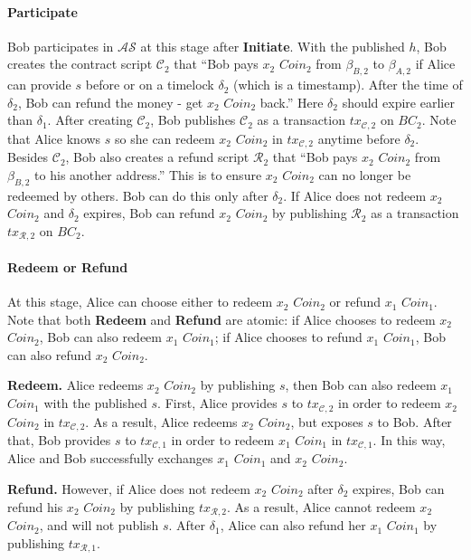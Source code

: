 \paragraph{\textbf{Participate}}
Bob participates in $\mathcal{AS}$ at this stage after \textbf{Initiate}.
With the published $h$, Bob creates the contract script $\mathcal{C}_2$ that ``Bob pays $x_2$ $Coin_2$ from $\beta_{B, 2}$ to $\beta_{A, 2}$ if Alice can provide $s$ before or on a timelock $\delta_2$ (which is a timestamp). After the time of $\delta_2$, Bob can refund the money - get $x_2$ $Coin_2$ back.''
Here $\delta_2$ should expire earlier than $\delta_1$.
After creating $\mathcal{C}_2$, Bob publishes $\mathcal{C}_2$ as a transaction $tx_{\mathcal{C}, 2}$ on $BC_2$.
Note that Alice knows $s$ so she can redeem $x_2$ $Coin_2$ in $tx_{\mathcal{C}, 2}$ anytime before $\delta_2$.
Besides $\mathcal{C}_2$, Bob also creates a refund script $\mathcal{R}_2$ that ``Bob pays $x_2$ $Coin_2$ from $\beta_{B, 2}$ to his another address.''
This is to ensure $x_2$ $Coin_2$ can no longer be redeemed by others. Bob can do this only after $\delta_2$.
If Alice does not redeem $x_2$ $Coin_2$ and $\delta_2$ expires, Bob can refund $x_2$ $Coin_2$ by publishing $\mathcal{R}_2$ as a transaction $tx_{\mathcal{R}, 2}$ on $BC_2$.

\paragraph{\textbf{Redeem} or \textbf{Refund}}
At this stage, Alice can choose either to redeem $x_2$ $Coin_2$ or refund $x_1$ $Coin_1$.
Note that both \textbf{Redeem} and \textbf{Refund} are atomic:
if Alice chooses to redeem $x_2$ $Coin_2$, Bob can also redeem $x_1$ $Coin_1$;
if Alice chooses to refund $x_1$ $Coin_1$, Bob can also refund $x_2$ $Coin_2$.

\textbf{Redeem.}
Alice redeems $x_2$ $Coin_2$ by publishing $s$, then Bob can also redeem $x_1$ $Coin_1$ with the published $s$.
First, Alice provides $s$ to $tx_{\mathcal{C}, 2}$ in order to redeem $x_2$ $Coin_2$ in $tx_{\mathcal{C}, 2}$.
As a result, Alice redeems $x_2$ $Coin_2$, but exposes $s$ to Bob.
After that, Bob provides $s$ to $tx_{\mathcal{C}, 1}$ in order to redeem $x_1$ $Coin_1$ in $tx_{\mathcal{C}, 1}$.
In this way, Alice and Bob successfully exchanges $x_1$ $Coin_1$ and $x_2$ $Coin_2$.

\textbf{Refund.}
However, if Alice does not redeem $x_2$ $Coin_2$ after $\delta_2$ expires, Bob can refund his $x_2$ $Coin_2$ by publishing $tx_{\mathcal{R}, 2}$.
As a result, Alice cannot redeem $x_2$ $Coin_2$, and will not publish $s$.
After $\delta_1$, Alice can also refund her $x_1$ $Coin_1$ by publishing $tx_{\mathcal{R}, 1}$.



